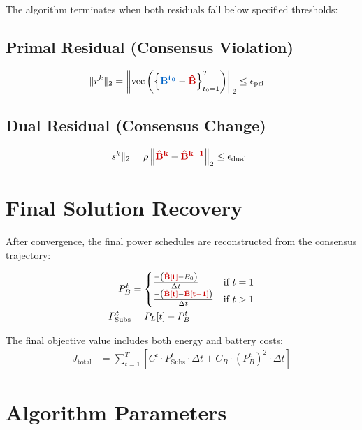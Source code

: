 \documentclass[11pt]{article}
\newcommand{\blueB}[1]{\textcolor{bluevar}{\mathbf{#1}}}      %
\newcommand{\redBhat}[1]{\textcolor{redvar}{\mathbf{#1}}}     %
\begin{document}
The algorithm terminates when both residuals fall below specified thresholds:

\subsection{Primal Residual (Consensus Violation)}
\begin{align}
\|r^k\|_2 &= \left\| \text{vec}\left( \left\{ \blueB{B^{t_0}} - \redBhat{\hat{B}} \right\}_{t_0=1}^T \right) \right\|_2 \leq \epsilon_{\text{pri}}
\end{align}

\subsection{Dual Residual (Consensus Change)}
\begin{align}
\|s^k\|_2 &= \rho \left\| \redBhat{\hat{B}^k} - \redBhat{\hat{B}^{k-1}} \right\|_2 \leq \epsilon_{\text{dual}}
\end{align}

\section{Final Solution Recovery}

After convergence, the final power schedules are reconstructed from the consensus trajectory:

\begin{align}
P_{B}^{t} &= 
\begin{cases}
\frac{-\left(\redBhat{\hat{B}[t]} - B_0\right)}{\Delta t} & \text{if } t = 1 \\
\frac{-\left(\redBhat{\hat{B}[t]} - \redBhat{\hat{B}[t-1]}\right)}{\Delta t} & \text{if } t > 1
\end{cases} \\
P_{\text{Subs}}^{t} &= P_L[t] - P_{B}^{t}
\end{align}

The final objective value includes both energy and battery costs:
\begin{align}
J_{\text{total}} &= \sum_{t=1}^{T} \left[ C^{t} \cdot P_{\text{Subs}}^{t} \cdot \Delta t + C_B \cdot \left(P_{B}^{t}\right)^2 \cdot \Delta t \right]
\end{align}

\section{Algorithm Parameters}
\end{document}
